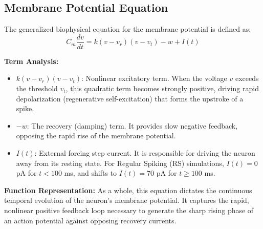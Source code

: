 \documentclass[conference]{IEEEtran}
\begin{document}
\subsection{Membrane Potential Equation}
The generalized biophysical equation for the membrane potential is defined as:
\begin{equation}
C_m \frac{dv}{dt} = k(v - v_r)(v - v_t) - w + I(t)
\end{equation}

\begin{table}[htbp]
\centering
\caption{Parameters for the Membrane Potential Equation}
\label{tab_volt_params}
\end{table}

\textbf{Term Analysis:}
\begin{itemize}
    \item $k(v-v_r)(v-v_t)$: Nonlinear excitatory term. When the voltage $v$ exceeds the threshold $v_t$, this quadratic term becomes strongly positive, driving rapid depolarization (regenerative self-excitation) that forms the upstroke of a spike.
    \item $-w$: The recovery (damping) term. It provides slow negative feedback, opposing the rapid rise of the membrane potential.
    \item $I(t)$: External forcing step current. It is responsible for driving the neuron away from its resting state. For Regular Spiking (RS) simulations, $I(t) = 0$ pA for $t < 100$ ms, and shifts to $I(t) = 70$ pA for $t \ge 100$ ms.
\end{itemize}

\textbf{Function Representation:} As a whole, this equation dictates the continuous temporal evolution of the neuron's membrane potential. It captures the rapid, nonlinear positive feedback loop necessary to generate the sharp rising phase of an action potential against opposing recovery currents.
\end{document}
